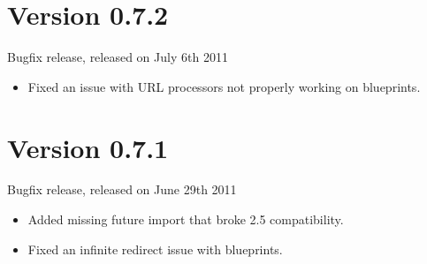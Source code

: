 \documentclass[a4paper,12pt]{sphinxmanual}
\begin{document}
\section{Version 0.7.2}
\label{changelog:version-0-7-2}
Bugfix release, released on July 6th 2011
\begin{itemize}
\item {} 
Fixed an issue with URL processors not properly working on
blueprints.

\end{itemize}


\section{Version 0.7.1}
\label{changelog:version-0-7-1}
Bugfix release, released on June 29th 2011
\begin{itemize}
\item {} 
Added missing future import that broke 2.5 compatibility.

\item {} 
Fixed an infinite redirect issue with blueprints.

\end{itemize}
\end{document}
